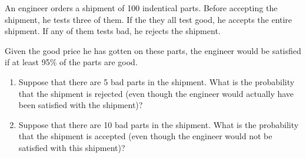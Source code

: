 \documentclass[twoside]{book}\usepackage[]{graphicx}\usepackage[]{xcolor}
\begin{document}
\begin{problem}
An engineer orders a shipment of 100 indentical parts.  
Before accepting the shipment, he tests three  of them.  
If the they all test good, he accepts the entire shipment.  
If any of them tests bad, he rejects the shipment.

Given the good price he has gotten on these parts, the engineer
would be satisfied if at least 95\% of the parts are good.
\begin{enumerate}
\item
Suppose that there are 5 bad parts in the shipment.  What is the probability
that the shipment is rejected (even though the engineer would actually have
been satisfied with the shipment)?
\item
Suppose that there are 10 bad parts in the shipment.  What is the probability
that the shipment is accepted (even though the engineer would not be satisfied 
with this shipment)?
\end{enumerate}
\end{problem}
\end{document}
